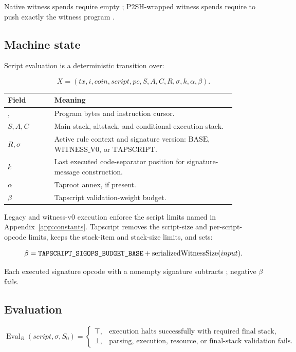 Native witness spends require empty ; P2SH-wrapped witness
spends require  to push exactly the witness program
\cite{bip-0016,bip-0141,bip-0143,bip-0340,bip-0341,bip-0342}.

\subsection{Machine state}

Script evaluation is a deterministic transition over:

\[
  X=(tx,i,coin,script,pc,S,A,C,R,\sigma,k,\alpha,\beta).
\]

\begin{longtable}{@{}L{0.18\linewidth}L{0.70\linewidth}@{}}
\toprule
Field & Meaning \\
\midrule
{},  & Program bytes and instruction cursor. \\
\(S,A,C\) & Main stack, altstack, and conditional-execution stack. \\
\(R,\sigma\) & Active rule context and signature version: \(\mathrm{BASE}\), \(\mathrm{WITNESS\_V0}\), or \(\mathrm{TAPSCRIPT}\). \\
\(k\) & Last executed code-separator position for signature-message construction. \\
\(\alpha\) & Taproot annex, if present. \\
\(\beta\) & Tapscript validation-weight budget. \\
\bottomrule
\end{longtable}

Legacy and witness-v0 execution enforce the script limits named in
Appendix~\ref{app:constants}. Tapscript removes the script-size and
per-script-opcode limits, keeps the stack-item and stack-size limits, and sets:

\[
  \beta =
  \text{\texttt{TAPSCRIPT\_SIGOPS\_BUDGET\_BASE}}+
  \operatorname{serializedWitnessSize}(input).
\]

Each executed signature opcode with a nonempty signature subtracts
; negative \(\beta\) fails.

\subsection{Evaluation}

\[
  \operatorname{Eval}_{R}(script,\sigma,S_0)=
  \begin{cases}
    \top, & \text{execution halts successfully with required final stack,}\\
    \bot, & \text{parsing, execution, resource, or final-stack validation fails.}
  \end{cases}
\]

